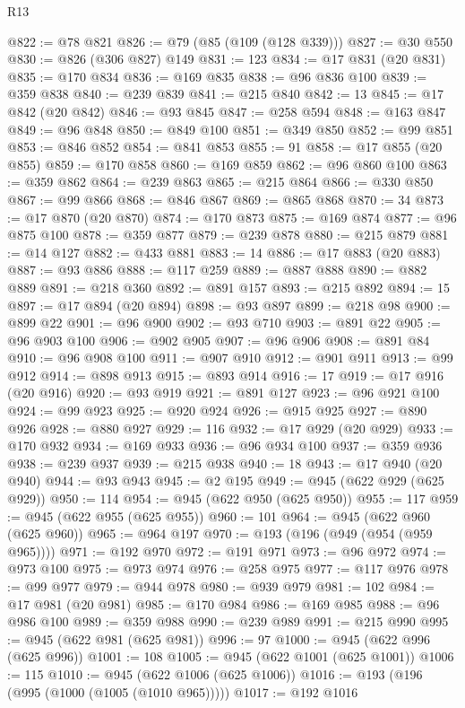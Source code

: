 \begin{lexlean}{R13}
\begin{coremodule}
@822 := @78 @821
@826 := @79 (@85 (@109 (@128 @339)))
@827 := @30 @550
@830 := @826 (@306 @827) @149
@831 := 123
@834 := @17 @831 (@20 @831)
@835 := @170 @834
@836 := @169 @835
@838 := @96 @836 @100
@839 := @359 @838
@840 := @239 @839
@841 := @215 @840
@842 := 13
@845 := @17 @842 (@20 @842)
@846 := @93 @845
@847 := @258 @594
@848 := @163 @847
@849 := @96 @848
@850 := @849 @100
@851 := @349 @850
@852 := @99 @851
@853 := @846 @852
@854 := @841 @853
@855 := 91
@858 := @17 @855 (@20 @855)
@859 := @170 @858
@860 := @169 @859
@862 := @96 @860 @100
@863 := @359 @862
@864 := @239 @863
@865 := @215 @864
@866 := @330 @850
@867 := @99 @866
@868 := @846 @867
@869 := @865 @868
@870 := 34
@873 := @17 @870 (@20 @870)
@874 := @170 @873
@875 := @169 @874
@877 := @96 @875 @100
@878 := @359 @877
@879 := @239 @878
@880 := @215 @879
@881 := @14 @127
@882 := @433 @881
@883 := 14
@886 := @17 @883 (@20 @883)
@887 := @93 @886
@888 := @117 @259
@889 := @887 @888
@890 := @882 @889
@891 := @218 @360
@892 := @891 @157
@893 := @215 @892
@894 := 15
@897 := @17 @894 (@20 @894)
@898 := @93 @897
@899 := @218 @98
@900 := @899 @22
@901 := @96 @900
@902 := @93 @710
@903 := @891 @22
@905 := @96 @903 @100
@906 := @902 @905
@907 := @96 @906
@908 := @891 @84
@910 := @96 @908 @100
@911 := @907 @910
@912 := @901 @911
@913 := @99 @912
@914 := @898 @913
@915 := @893 @914
@916 := 17
@919 := @17 @916 (@20 @916)
@920 := @93 @919
@921 := @891 @127
@923 := @96 @921 @100
@924 := @99 @923
@925 := @920 @924
@926 := @915 @925
@927 := @890 @926
@928 := @880 @927
@929 := 116
@932 := @17 @929 (@20 @929)
@933 := @170 @932
@934 := @169 @933
@936 := @96 @934 @100
@937 := @359 @936
@938 := @239 @937
@939 := @215 @938
@940 := 18
@943 := @17 @940 (@20 @940)
@944 := @93 @943
@945 := @2 @195
@949 := @945 (@622 @929 (@625 @929))
@950 := 114
@954 := @945 (@622 @950 (@625 @950))
@955 := 117
@959 := @945 (@622 @955 (@625 @955))
@960 := 101
@964 := @945 (@622 @960 (@625 @960))
@965 := @964 @197
@970 := @193 (@196 (@949 (@954 (@959 @965))))
@971 := @192 @970
@972 := @191 @971
@973 := @96 @972
@974 := @973 @100
@975 := @973 @974
@976 := @258 @975
@977 := @117 @976
@978 := @99 @977
@979 := @944 @978
@980 := @939 @979
@981 := 102
@984 := @17 @981 (@20 @981)
@985 := @170 @984
@986 := @169 @985
@988 := @96 @986 @100
@989 := @359 @988
@990 := @239 @989
@991 := @215 @990
@995 := @945 (@622 @981 (@625 @981))
@996 := 97
@1000 := @945 (@622 @996 (@625 @996))
@1001 := 108
@1005 := @945 (@622 @1001 (@625 @1001))
@1006 := 115
@1010 := @945 (@622 @1006 (@625 @1006))
@1016 := @193 (@196 (@995 (@1000 (@1005 (@1010 @965)))))
@1017 := @192 @1016

\end{coremodule}
\end{lexlean}

